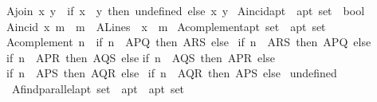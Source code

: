 \begin{isabellebody}
{\isachardoublequoteopen}A{}join\ x\ y\ {\isacharequal}{\kern0pt}\ {\isacharparenleft}{\kern0pt}if\ {\isacharparenleft}{\kern0pt}x\ {\isacharequal}{\kern0pt}\ y{\isacharparenright}{\kern0pt}\ then\ undefined\ else\ {\isacharbraceleft}{\kern0pt}x{\isacharcomma}{\kern0pt}\ y{\isacharbraceright}{\kern0pt}{\isacharparenright}{\kern0pt}{\isachardoublequoteclose}\isanewline
\isanewline
\isanewline
{}\isamarkupfalse%
\ A{}incid{\isacharcolon}{\kern0pt}{\isacharcolon}{\kern0pt}{\isachardoublequoteopen}a{}pt\ {\isasymRightarrow}\ a{}pt\ set\ {\isasymRightarrow}\ bool{\isachardoublequoteclose}\ \isanewline
{\isachardoublequoteopen}A{}incid\ x\ m\ {\isacharequal}{\kern0pt}\ {\isacharparenleft}{\kern0pt}{\isacharparenleft}{\kern0pt}m\ {\isasymin}\ A{}Lines{\isacharparenright}{\kern0pt}\ {\isasymand}\ {\isacharparenleft}{\kern0pt}x\ {\isasymin}\ m{\isacharparenright}{\kern0pt}{\isacharparenright}{\kern0pt}{\isachardoublequoteclose}\isanewline
\isanewline
{}\isamarkupfalse%
\ A{}complement{\isacharcolon}{\kern0pt}{\isacharcolon}{\kern0pt}{\isachardoublequoteopen}a{}pt\ set\ {\isasymRightarrow}\ a{}pt\ set{\isachardoublequoteclose}\ \isanewline
{\isachardoublequoteopen}A{}complement\ n\ {\isacharequal}{\kern0pt}\ {\isacharparenleft}{\kern0pt}if\ n\ {\isacharequal}{\kern0pt}\ A{}PQ\ then\ A{}RS\ else\ \isanewline
{\isacharparenleft}{\kern0pt}if\ n\ {\isacharequal}{\kern0pt}\ A{}RS\ then\ A{}PQ\ else\ \isanewline
{\isacharparenleft}{\kern0pt}if\ n\ {\isacharequal}{\kern0pt}\ A{}PR\ then\ A{}QS\ else\isanewline
{\isacharparenleft}{\kern0pt}if\ n\ {\isacharequal}{\kern0pt}\ A{}QS\ then\ A{}PR\ else\ \isanewline
{\isacharparenleft}{\kern0pt}if\ n\ {\isacharequal}{\kern0pt}\ A{}PS\ then\ A{}QR\ else\ \isanewline
{\isacharparenleft}{\kern0pt}if\ n\ {\isacharequal}{\kern0pt}\ A{}QR\ then\ A{}PS\ else\ \isanewline
undefined{\isacharparenright}{\kern0pt}{\isacharparenright}{\kern0pt}{\isacharparenright}{\kern0pt}{\isacharparenright}{\kern0pt}{\isacharparenright}{\kern0pt}{\isacharparenright}{\kern0pt}{\isachardoublequoteclose}\isanewline
\isanewline
{}\isamarkupfalse%
\ A{}find{\isacharunderscore}{\kern0pt}parallel{\isacharcolon}{\kern0pt}{\isacharcolon}{\kern0pt}{\isachardoublequoteopen}a{}pt\ set\ {\isasymRightarrow}\ a{}pt\ {\isasymRightarrow}\ a{}pt\ set{\isachardoublequoteclose}\ \ \isanewline

\end{isabellebody}
